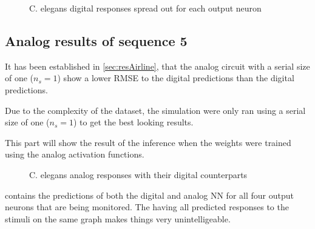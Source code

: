 \begin{figure}[H]
  \centering
  \begin{minipage}{\columnwidth}
    \hfill
  \end{minipage}
  \begin{minipage}{\columnwidth}
    \hfill
  \end{minipage}
  \caption{\ac{C. elegans} digital responses spread out for each output neuron}
  \label{graph:digital15Celegans}
\end{figure}

\subsection{Analog results of sequence 5}
\label{subsec:analog5Celegans}

It has been established in \cref{sec:resAirline}, that the analog circuit with a serial size of one ($n_s=1$) show a lower \ac{RMSE} to the digital predictions than the digital predictions.

Due to the complexity of the dataset, the simulation were only ran using a serial size of one ($n_s=1$) to get the best looking results.

This part will show the result of the inference when the weights were trained using the analog activation functions.

\begin{figure}[H]
  \centering
  
  \caption{\acs{C. elegans} analog responses with their digital counterparts}
  \label{graph:celegansAnalog0}
\end{figure}

 contains the predictions of both the digital and analog \ac{NN} for all four output neurons that are being monitored. The having all predicted responses to the stimuli on the same graph makes things very unintelligeable.

